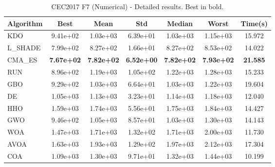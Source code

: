 \begin{table}[H]
\centering\small
\caption{CEC2017 F7 (Numerical) - Detailed results. Best in bold.}
\label{tab:cec2017_F7}
\begin{tabular}{lcccccc}
\toprule
\textbf{Algorithm} & \textbf{Best} & \textbf{Mean} & \textbf{Std} & \textbf{Median} & \textbf{Worst} & \textbf{Time(s)} \\
\midrule
KDO & 9.41e+02 & 1.03e+03 & 6.39e+01 & 1.03e+03 & 1.15e+03 & 15.972 \\
L_SHADE & 7.99e+02 & 8.27e+02 & 1.66e+01 & 8.27e+02 & 8.53e+02 & 14.022 \\
CMA_ES & \textbf{7.67e+02} & \textbf{7.82e+02} & \textbf{6.52e+00} & \textbf{7.82e+02} & \textbf{7.93e+02} & \textbf{21.585} \\
RUN & 8.96e+02 & 1.19e+03 & 1.05e+02 & 1.22e+03 & 1.28e+03 & 15.233 \\
GBO & 9.29e+02 & 1.03e+03 & 6.64e+01 & 1.03e+03 & 1.22e+03 & 19.604 \\
DE & 1.05e+03 & 1.13e+03 & 3.23e+01 & 1.14e+03 & 1.18e+03 & 12.040 \\
HHO & 1.59e+03 & 1.74e+03 & 5.56e+01 & 1.75e+03 & 1.84e+03 & 14.427 \\
GWO & 9.46e+02 & 1.05e+03 & 8.57e+01 & 1.03e+03 & 1.30e+03 & 14.143 \\
WOA & 1.47e+03 & 1.71e+03 & 1.32e+02 & 1.71e+03 & 2.00e+03 & 11.730 \\
AVOA & 1.63e+03 & 1.93e+03 & 1.29e+02 & 1.97e+03 & 2.12e+03 & 17.304 \\
COA & 1.09e+03 & 1.30e+03 & 9.71e+01 & 1.32e+03 & 1.44e+03 & 10.199 \\
\bottomrule
\end{tabular}
\end{table}
